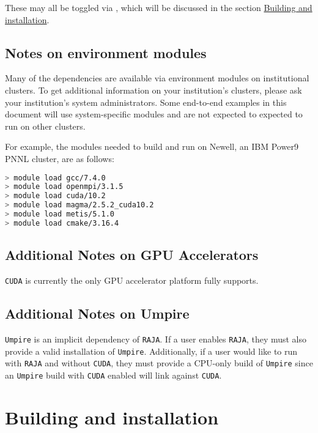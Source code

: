 \noindent
These may all be toggled via \cmake, which will be discussed in the section \hyperref[sec:building_and_installation]{Building and installation}.

\subsection{Notes on environment modules}

Many of the dependencies are available via environment modules on institutional clusters.
To get additional information on your institution's clusters, please ask your institution's system administrators.
Some end-to-end examples in this document will use system-specific modules and are not expected to expected to run on other clusters.

For example, the modules needed to build and run \exago on Newell, an IBM Power9 PNNL cluster, are as follows:

\begin{lstlisting}[language=bash]
> module load gcc/7.4.0
> module load openmpi/3.1.5
> module load cuda/10.2
> module load magma/2.5.2_cuda10.2
> module load metis/5.1.0
> module load cmake/3.16.4
\end{lstlisting}

\subsection{Additional Notes on GPU Accelerators}

\texttt{CUDA} is currently the only GPU accelerator platform \exago fully supports.

\subsection{Additional Notes on Umpire}

\texttt{Umpire} is an implicit dependency of \texttt{RAJA}.
If a user enables \texttt{RAJA}, they must also provide a valid installation of \texttt{Umpire}.
Additionally, if a user would like to run \exago with \texttt{RAJA} and without \texttt{CUDA}, they must provide a CPU-only build of \texttt{Umpire} since an \texttt{Umpire} build with \texttt{CUDA} enabled will link against \texttt{CUDA}.

\section{Building and installation}
\label{sec:building_and_installation}

